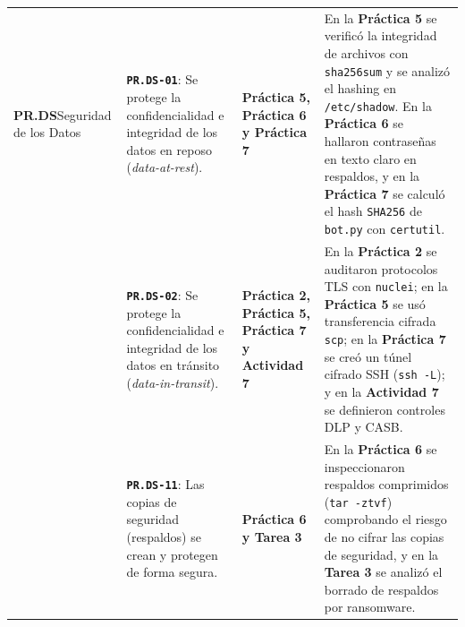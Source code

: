 \documentclass[letterpaper,11pt]{article}
\begin{document}
\begin{longtable}{|L{2.8cm}|L{4.5cm}|L{2.9cm}|L{6.5cm}|}
\textbf{PR.DS}\newline Seguridad de los Datos &
\textbf{\texttt{PR.DS-01}}: Se protege la confidencialidad e integridad de los datos en reposo (\textit{data-at-rest}). &
\textbf{Práctica 5, Práctica 6 y Práctica 7} &
En la \textbf{Práctica 5} se verificó la integridad de archivos con \texttt{sha256sum} y se analizó el hashing en \texttt{/etc/shadow}. En la \textbf{Práctica 6} se hallaron contraseñas en texto claro en respaldos, y en la \textbf{Práctica 7} se calculó el hash \texttt{SHA256} de \texttt{bot.py} con \texttt{certutil}. \\
\nopagebreak
 &
\textbf{\texttt{PR.DS-02}}: Se protege la confidencialidad e integridad de los datos en tránsito (\textit{data-in-transit}). &
\textbf{Práctica 2, Práctica 5, Práctica 7 y Actividad 7} &
En la \textbf{Práctica 2} se auditaron protocolos TLS con \texttt{nuclei}; en la \textbf{Práctica 5} se usó transferencia cifrada \texttt{scp}; en la \textbf{Práctica 7} se creó un túnel cifrado SSH (\texttt{ssh -L}); y en la \textbf{Actividad 7} se definieron controles DLP y CASB. \\
\nopagebreak
 &
\textbf{\texttt{PR.DS-11}}: Las copias de seguridad (respaldos) se crean y protegen de forma segura. &
\textbf{Práctica 6 y Tarea 3} &
En la \textbf{Práctica 6} se inspeccionaron respaldos comprimidos (\texttt{tar -ztvf}) comprobando el riesgo de no cifrar las copias de seguridad, y en la \textbf{Tarea 3} se analizó el borrado de respaldos por ransomware. \\
\hline


\end{longtable}
\end{document}

